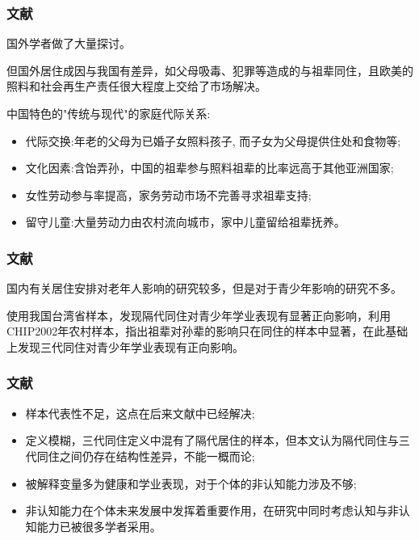 \documentclass{beamer}
\begin{document}
\begin{frame}
\frametitle{文献} 
国外学者做了大量探讨\citep{hayslip_grandparents_2005,monserud_household_2011,westphal_what_2015,jappens_parental_2016,daniela_del_boca_role_2017,zamberletti_grandparents_2018}。
\par 但国外居住成因与我国有差异，如父母吸毒\citep{NBERw27633}、犯罪等造成的与祖辈同住，且欧美的照料和社会再生产责任很大程度上交给了市场解决。
\par 中国特色的"传统与现代"的家庭代际关系\citep{shi_2016,ji_2019}:
	\begin{itemize}
		\item 代际交换:年老的父母为已婚子女照料孩子, 而子女为父母提供住处和食物等\citep{wang_2008};
		\item 文化因素:\citep{chu_coresidence_2011}含饴弄孙，中国的祖辈参与照料祖辈的比率远高于其他亚洲国家\citep{zhou_2016};
		\item 女性劳动参与率提高\citep{lv_2016}，家务劳动市场不完善寻求祖辈支持;
		\item 留守儿童:大量劳动力由农村流向城市，家中儿童留给祖辈抚养。
	\end{itemize}
\end{frame}
\begin{frame}
\frametitle{文献} 
	国内有关居住安排对老年人影响的研究较多，但是对于青少年影响的研究不多\citep{pong_co-resident_2010,zeng_effects_2014,liang_2017,he_childhood_2018,张帆2020}。
	\par \citet{pong_co-resident_2010}使用我国台湾省样本，发现隔代同住对青少年学业表现有显著正向影响，\citet{zeng_effects_2014}利用CHIP2002年农村样本，指出祖辈对孙辈的影响只在同住的样本中显著，在此基础上\citet{张帆2020}发现三代同住对青少年学业表现有正向影响。
		
\end{frame}

\begin{frame}
\frametitle{文献} 
	\begin{itemize}
			\item 样本代表性不足\citep{pong_co-resident_2010}，这点在后来文献中已经解决;
			\item 定义模糊，\citet{张帆2020}三代同住定义中混有了隔代居住的样本，但本文认为隔代同住与三代同住之间仍存在结构性差异，不能一概而论;
			\item 被解释变量多为健康\citep{liang_2017,he_childhood_2018}和学业表现\citep{张帆2020}，对于个体的非认知能力涉及不够;
			\item 非认知能力在个体未来发展中发挥着重要作用\citep{heckman_effects_2006,kautz_fostering_2014,赖德胜_2020}，在研究中同时考虑认知与非认知能力已被很多学者采用\citep{huang_2017,le_2017}。
	\end{itemize}

\end{frame}
\end{document}
